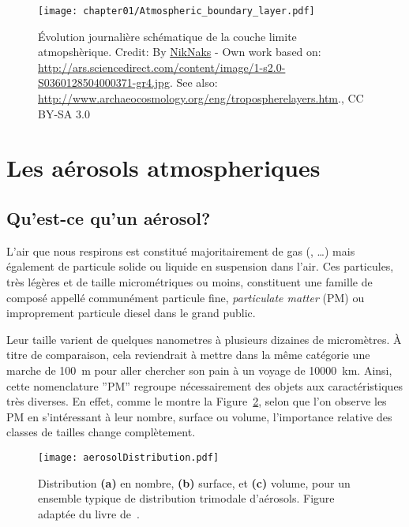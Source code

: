 \begin{figure}[h]
    \centering
    \texttt{[image: chapter01/Atmospheric\_boundary\_layer.pdf]}
    \caption{Évolution journalière schématique de la couche limite atmopshèrique.
        Credit: By
        \href{https://commons.wikimedia.org/w/index.php?curid=18862904}{NikNaks} - Own
        work based on:
        \url{http://ars.sciencedirect.com/content/image/1-s2.0-S0360128504000371-gr4.jpg}.
        See also: \url{http://www.archaeocosmology.org/eng/tropospherelayers.htm}., CC
        BY-SA 3.0
    }%
    \label{fig:chapter01/Atmospheric_boundary_layer}
\end{figure}


\section{Les aérosols atmospheriques}%
\label{sec:les_aerosols_atmospheriques}

\subsection{Qu'est-ce qu'un aérosol?}%
\label{sub:quest-ce-quun-aerosol}

L'air que nous respirons est constitué majoritairement de gas (, …) mais
également de particule solide ou liquide en suspension dans l'air. Ces particules, très
légères et de taille micrométriques ou moins, constituent une famille de composé appellé
communément particule fine, \textit{particulate matter} (PM) ou improprement particule
diesel dans le grand public.

Leur taille varient de quelques nanometres à plusieurs dizaines de micromètres.
À titre de comparaison, cela reviendrait à mettre dans la même catégorie une marche de
\SI{100}{m} pour aller chercher son pain à un voyage de \SI{10000}{km}.
Ainsi, cette nomenclature ''PM'' regroupe nécessairement des objets aux caractéristiques
très diverses. En effet, comme le montre la Figure~\ref{fig:aerosolDistribution}, selon
que l'on observe les PM en s'intéressant à leur nombre, surface ou volume, l'importance
relative des classes de tailles change complètement.
\begin{figure}[ht]
    \centering
    \texttt{[image: aerosolDistribution.pdf]}
    \caption{Distribution \textbf{(a)} en nombre, \textbf{(b)} surface, et
        \textbf{(c)} volume, pour un ensemble typique de distribution trimodale
        d'aérosols. Figure adaptée du livre de~\textcite{seinfieldAtmospheric1998}.}
    \label{fig:aerosolDistribution}
\end{figure}

